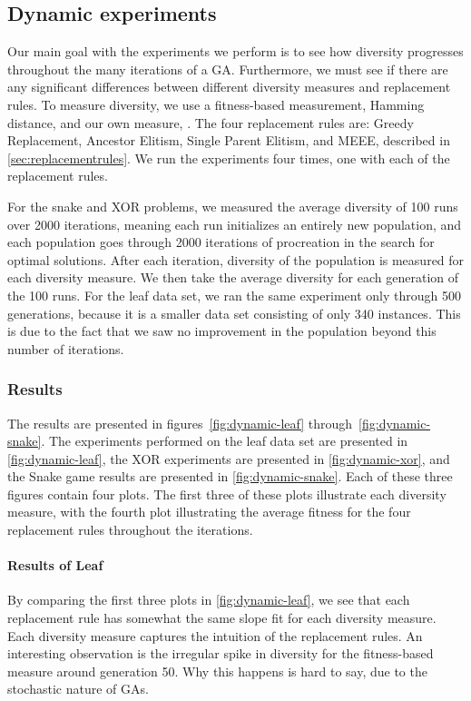 \subsection{Dynamic experiments}\label{sec:continuousdiversity}
Our main goal with the experiments we perform is to see how diversity progresses throughout the many iterations of a GA. Furthermore, we must see if there are any significant differences between different diversity measures and replacement rules. To measure diversity, we use a fitness-based measurement, Hamming distance, and our own measure, \dia. The four replacement rules are: Greedy Replacement, Ancestor Elitism, Single Parent Elitism, and MEEE, described in \cref{sec:replacementrules}. We run the experiments four times, one with each of the replacement rules.

For the snake and XOR problems, we measured the average diversity of \num{100} runs over \num{2000} iterations, meaning each run initializes an entirely new population, and each population goes through \num{2000} iterations of procreation in the search for optimal solutions. After each iteration, diversity of the population is measured for each diversity measure. We then take the average diversity for each generation of the \num{100} runs. For the leaf data set, we ran the same experiment only through \num{500} generations, because it is a smaller data set consisting of only \num{340} instances. This is due to the fact that we saw no improvement in the population beyond this number of iterations. 

\subsubsection{Results}
The results are presented in figures~\ref{fig:dynamic-leaf} through~\ref{fig:dynamic-snake}. The experiments performed on the leaf data set are presented in \cref{fig:dynamic-leaf}, the XOR experiments are presented in \cref{fig:dynamic-xor}, and the Snake game results are presented in \cref{fig:dynamic-snake}. Each of these three figures contain four plots. The first three of these plots illustrate each diversity measure, with the fourth plot illustrating the average fitness for the four replacement rules throughout the iterations. 

\paragraph{Results of Leaf} By comparing the first three plots in \cref{fig:dynamic-leaf}, we see that each replacement rule has somewhat the same slope fit for each diversity measure. Each diversity measure captures the intuition of the replacement rules. An interesting observation is the irregular spike in diversity for the fitness-based measure around generation \num{50}. Why this happens is hard to say, due to the stochastic nature of GAs.

